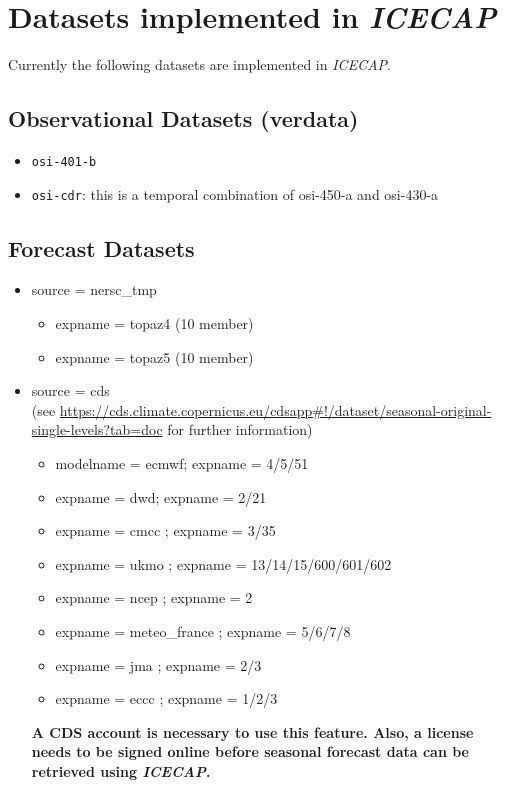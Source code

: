 \documentclass[DIV=10, parskip=full]{scrreprt}
\newcommand{\ice}{\textit{ICECAP}\xspace}
\newcommand{\notimplement}[1]{#1}
\begin{document}
\section{Datasets implemented in \ice} \label{chap:data}
\notimplement{Currently} the following datasets are implemented in \ice.

\subsection{Observational Datasets (verdata)}

\begin{itemize}
		\item \texttt{osi-401-b}
		\item \texttt{osi-cdr}: this is a temporal combination of osi-450-a and osi-430-a
\end{itemize}
	
\subsection{Forecast Datasets}
\begin{itemize}
	\item source = nersc\_tmp
	\begin{itemize}
		\item expname = topaz4 (10 member)
		\item expname = topaz5 (10 member)
	\end{itemize}
	\item source = cds \\
	(see \url{https://cds.climate.copernicus.eu/cdsapp#!/dataset/seasonal-original-single-levels?tab=doc} for further information)
	\begin{itemize}
		\item modelname = ecmwf; expname = 4/5/51
		\item expname = dwd; expname = 2/21
		\item expname = cmcc ; expname = 3/35
		\item expname = ukmo ; expname = 13/14/15/600/601/602
		\item expname = ncep ; expname = 2
		\item expname = meteo\_france ; expname = 5/6/7/8
		\item expname = jma ; expname = 2/3
		\item expname = eccc ; expname = 1/2/3
	\end{itemize}
	\textbf{A CDS account is necessary to use this feature. Also, a license needs to be signed online before seasonal forecast data can be retrieved using \ice.}
\end{itemize}
\end{document}
